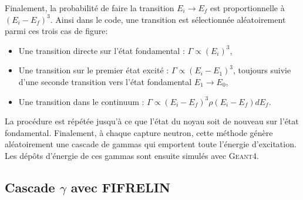 \bigbreak

Finalement, la probabilité de faire la transition $E_i \rightarrow E_f$ est proportionnelle à $(E_i - E_f)^3$. Ainsi dans le code, une transition est sélectionnée aléatoirement parmi ces trois cas de figure:\\



\begin{itemize}[label=\textbullet]
    \item Une transition directe sur l'état fondamental : $\Gamma \propto (E_i)^3$,
    \item Une transition sur le premier état excité : $\Gamma \propto (E_i - E_1)^3$, toujours suivie d'une seconde transition vers l'état fondamental $E_1 \rightarrow E_0$,
    \item Une transition dans le continuum : $\Gamma \propto (E_i - E_f)^3 \rho (E_i - E_f) dE_f$.
\end{itemize}

\bigbreak

La procédure est répétée jusqu'à ce que l'état du noyau soit de nouveau sur l'état fondamental. Finalement, à chaque capture neutron, cette méthode génère aléatoirement une cascade de gammas qui emportent toute l'énergie d'excitation. Les dépôts d'énergie de ces gammas sont ensuite simulés avec \textsc{Geant4}.\\

\subsection{Cascade $\gamma$ avec FIFRELIN}

